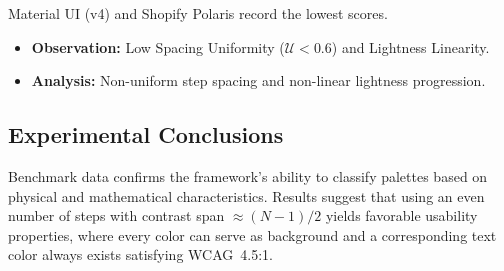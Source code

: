 Material UI (v4) and Shopify Polaris record the lowest scores.
\begin{itemize}
\item \textbf{Observation:} Low Spacing Uniformity ($\mathcal{U} < 0.6$) and
Lightness Linearity.
\item \textbf{Analysis:} Non-uniform step spacing and non-linear lightness
progression.
\end{itemize}

\subsection{Experimental Conclusions}

Benchmark data confirms the framework’s ability to classify palettes based on
physical and mathematical characteristics. Results suggest that using an even
number of steps with contrast span $\approx (N-1)/2$ yields favorable usability
properties, where every color can serve as background and a corresponding text
color always exists satisfying WCAG~4.5:1.
